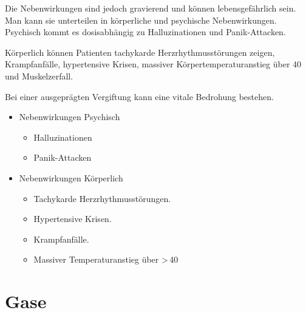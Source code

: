{
Die Nebenwirkungen sind jedoch
gravierend und können lebensgefährlich sein. Man kann sie
unterteilen in körperliche und psychische Nebenwirkungen. 
Psychisch kommt es dosisabhängig zu Halluzinationen
und Panik-Attacken. 

Körperlich können Patienten tachykarde
Herzrhythmusstörungen zeigen, Krampfanfälle, hypertensive
Krisen, massiver Körpertemperaturanstieg über
40\textdegree{} und Muskelzerfall.

Bei einer ausgeprägten Vergiftung kann eine vitale
Bedrohung bestehen. }{
\begin{itemize}
  \item Nebenwirkungen Psychisch
  \begin{itemize}
    \item Halluzinationen
    \item Panik-Attacken
  \end{itemize}
  \item Nebenwirkungen Körperlich
  \begin{itemize}
    \item Tachykarde Herzrhythmusstörungen.
    \item Hypertensive Krisen.
    \item Krampfanfälle.
    \item Massiver Temperaturanstieg über
    {\textgreater}\,40\textdegree{}
  \end{itemize}
\end{itemize}
}{}{}{}




\cite{Supady2009}









\section{Gase}

